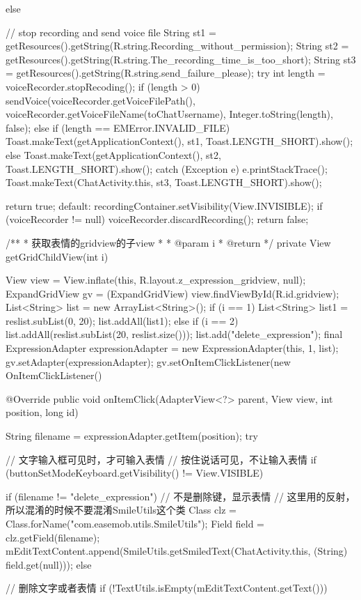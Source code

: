 {{{{{				} else {
					// stop recording and send voice file
					String st1 = getResources().getString(R.string.Recording_without_permission);
					String st2 = getResources().getString(R.string.The_recording_time_is_too_short);
					String st3 = getResources().getString(R.string.send_failure_please);
					try {
						int length = voiceRecorder.stopRecoding();
						if (length > 0) {
							sendVoice(voiceRecorder.getVoiceFilePath(), voiceRecorder.getVoiceFileName(toChatUsername),
									Integer.toString(length), false);
						} else if (length == EMError.INVALID_FILE) {
							Toast.makeText(getApplicationContext(), st1, Toast.LENGTH_SHORT).show();
						} else {
							Toast.makeText(getApplicationContext(), st2, Toast.LENGTH_SHORT).show();
						}
					} catch (Exception e) {
						e.printStackTrace();
						Toast.makeText(ChatActivity.this, st3, Toast.LENGTH_SHORT).show();
					}

				}
				return true;
			default:
				recordingContainer.setVisibility(View.INVISIBLE);
				if (voiceRecorder != null)
					voiceRecorder.discardRecording();
				return false;
			}
		}
	}

	/**
	 * 获取表情的gridview的子view
	 * 
	 * @param i
	 * @return
	 */
	private View getGridChildView(int i) {
		View view = View.inflate(this, R.layout.z_expression_gridview, null);
		ExpandGridView gv = (ExpandGridView) view.findViewById(R.id.gridview);
		List<String> list = new ArrayList<String>();
		if (i == 1) {
			List<String> list1 = reslist.subList(0, 20);
			list.addAll(list1);
		} else if (i == 2) {
			list.addAll(reslist.subList(20, reslist.size()));
		}
		list.add("delete_expression");
		final ExpressionAdapter expressionAdapter = new ExpressionAdapter(this, 1, list);
		gv.setAdapter(expressionAdapter);
		gv.setOnItemClickListener(new OnItemClickListener() {

			@Override
			public void onItemClick(AdapterView<?> parent, View view, int position, long id) {
				String filename = expressionAdapter.getItem(position);
				try {
					// 文字输入框可见时，才可输入表情
					// 按住说话可见，不让输入表情
					if (buttonSetModeKeyboard.getVisibility() != View.VISIBLE) {

						if (filename != "delete_expression") { // 不是删除键，显示表情
							// 这里用的反射，所以混淆的时候不要混淆SmileUtils这个类
							Class clz = Class.forName("com.easemob.utils.SmileUtils");
							Field field = clz.getField(filename);
							mEditTextContent.append(SmileUtils.getSmiledText(ChatActivity.this,
									(String) field.get(null)));
						} else { // 删除文字或者表情
							if (!TextUtils.isEmpty(mEditTextContent.getText())) {

}}}}}}}}
